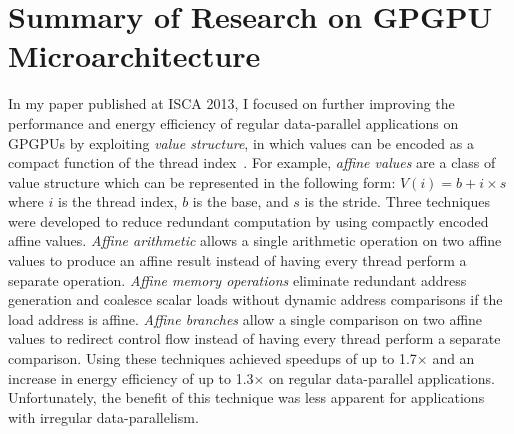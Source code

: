 
\section{Summary of Research on GPGPU Microarchitecture}
\label{sec-background}

In my paper published at ISCA 2013, I focused on further improving the
performance and energy efficiency of regular data-parallel
applications on GPGPUs by exploiting \emph{value structure}, in which
values can be encoded as a compact function of the thread
index~\cite{kim-simt-vstruct-isca2013}.  For example, \emph{affine
  values} are a class of value structure which can be represented in the
following form: $V(i) = b + i \times s$ where $i$ is the thread index,
$b$ is the base, and $s$ is the stride.  Three techniques were developed
to reduce redundant computation by using compactly encoded affine values.
\emph{Affine arithmetic} allows a single arithmetic operation on two
affine values to produce an affine result instead of having every thread
perform a separate operation. \emph{Affine memory operations} eliminate
redundant address generation and coalesce scalar loads without dynamic
address comparisons if the load address is affine. \emph{Affine branches}
allow a single comparison on two affine values to redirect control flow
instead of having every thread perform a separate comparison.  Using
these techniques achieved speedups of up to 1.7$\times$ and an increase
in energy efficiency of up to 1.3$\times$ on regular data-parallel
applications. Unfortunately, the benefit of this technique was less
apparent for applications with irregular data-parallelism.

